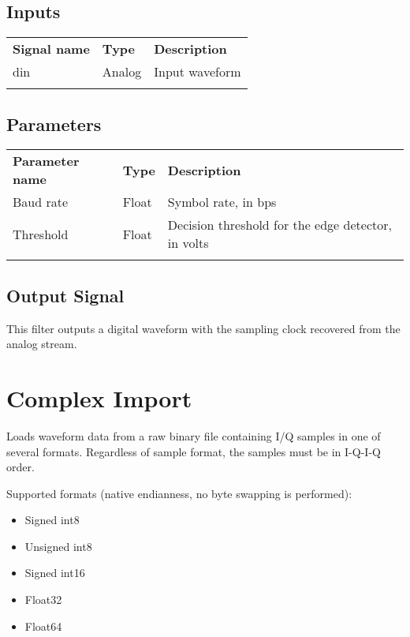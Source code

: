\subsection{Inputs}

\begin{tabularx}{16cm}{llX}
\thickhline
\textbf{Signal name} & \textbf{Type} & \textbf{Description} \\
\thickhline
din & Analog & Input waveform \\
\thickhline
\end{tabularx}

\subsection{Parameters}

\begin{tabularx}{16cm}{llX}
\thickhline
\textbf{Parameter name} & \textbf{Type} & \textbf{Description} \\
\thickhline
Baud rate & Float & Symbol rate, in bps \\
\thinhline
Threshold & Float & Decision threshold for the edge detector, in volts \\
\thickhline
\end{tabularx}

\subsection{Output Signal}

This filter outputs a digital waveform with the sampling clock recovered from the analog stream.

\pagebreak
\section{Complex Import}

Loads waveform data from a raw binary file containing I/Q samples in one of several formats. Regardless of sample
format, the samples must be in I-Q-I-Q order.

Supported formats (native endianness, no byte swapping is performed):
\begin{itemize}
\item Signed int8
\item Unsigned int8
\item Signed int16
\item Float32
\item Float64
\end{itemize}

